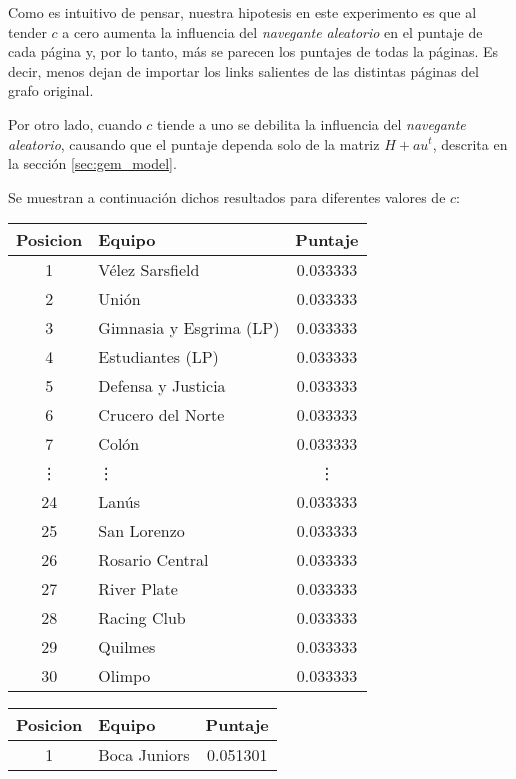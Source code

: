 Como es intuitivo de pensar, nuestra hipotesis en este experimento es que al tender
$c$ a cero aumenta la influencia del \textit{navegante aleatorio} en el puntaje de
cada página y, por lo tanto, más se parecen los puntajes de todas la páginas.
Es decir, menos dejan de importar los links salientes de las distintas páginas
del grafo original.

Por otro lado, cuando $c$ tiende a uno se debilita la influencia del \textit{navegante
aleatorio}, causando que el puntaje dependa solo de la matriz $H + au^{t}$, descrita
en la sección \ref{sec:gem_model}.

Se muestran a continuación dichos resultados para diferentes valores de $c$:

\begin{table}[H]
    \begin{center}
        \begin{tabular}{| c | l | c |}
            \hline
            Posicion & Equipo & Puntaje \\ \hline
            1 & Vélez Sarsfield & 0.033333 \\
            2 & Unión & 0.033333 \\
            3 & Gimnasia y Esgrima (LP) & 0.033333 \\
            4 & Estudiantes (LP) & 0.033333 \\
            5 & Defensa y Justicia & 0.033333 \\
            6 & Crucero del Norte & 0.033333 \\
            7 & Colón & 0.033333 \\
            \vdots & \quad\vdots & \vdots \\
            24 & Lanús & 0.033333 \\
            25 & San Lorenzo & 0.033333 \\
            26 & Rosario Central & 0.033333 \\
            27 & River Plate & 0.033333 \\
            28 & Racing Club & 0.033333 \\
            29 & Quilmes & 0.033333 \\
            30 & Olimpo & 0.033333 \\
            \hline
        \end{tabular}
        \begin{tabular}{| c | l | c |}
            \hline
            Posicion & Equipo & Puntaje \\ \hline
            1 & Boca Juniors & 0.051301 \\

\end{tabular}
\end{center}
\end{table}
